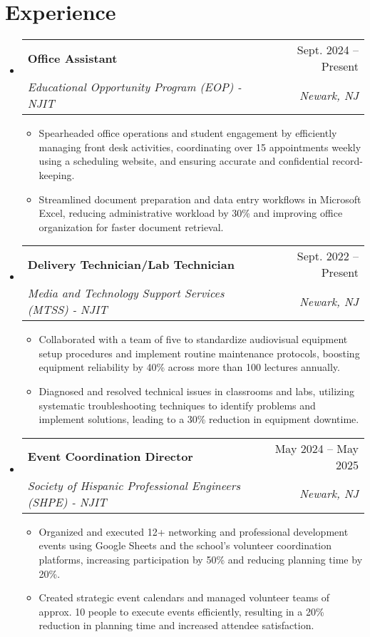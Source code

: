 \documentclass[letterpaper,11pt]{article}
\makeatletter
\newcommand{\resumeItem}[1]{\item\small{{#1 \vspace{-2pt}}}}
\newcommand{\resumeSubheading}[4]{
  \vspace{-2pt}\item
    \begin{tabular*}{0.97\textwidth}[t]{l@{\extracolsep{\fill}}r}
      \textbf{#1} & #2 \\
      \textit{\small#3} & \textit{\small #4} \\
    \end{tabular*}\vspace{-7pt}
}
\newcommand{\resumeSubHeadingListStart}{\begin{itemize}[leftmargin=0.15in, label={}]}
\newcommand{\resumeSubHeadingListEnd}{\end{itemize}}
\newcommand{\resumeItemListStart}{\begin{itemize}}
\newcommand{\resumeItemListEnd}{\end{itemize}\vspace{-5pt}}
\makeatother
\begin{document}
\section{Experience}
  \resumeSubHeadingListStart
    \resumeSubheading
      {Office Assistant}{Sept. 2024 -- Present}
      {Educational Opportunity Program (EOP) - NJIT}{Newark, NJ}
      \resumeItemListStart
        \resumeItem{Spearheaded office operations and student engagement by efficiently managing front desk activities, coordinating over 15 appointments weekly using a scheduling website, and ensuring accurate and confidential record-keeping.}
        \resumeItem{Streamlined document preparation and data entry workflows in Microsoft Excel, reducing administrative workload by 30\% and improving office organization for faster document retrieval.}
      \resumeItemListEnd

    \resumeSubheading
      {Delivery Technician/Lab Technician}{Sept. 2022 -- Present}
      {Media and Technology Support Services (MTSS) - NJIT}{Newark, NJ}
      \resumeItemListStart
        \resumeItem{Collaborated with a team of five to standardize audiovisual equipment setup procedures and implement routine maintenance protocols, boosting equipment reliability by 40\% across more than 100 lectures annually.}
        \resumeItem{Diagnosed and resolved technical issues in classrooms and labs, utilizing systematic troubleshooting techniques to identify problems and implement solutions, leading to a 30\% reduction in equipment downtime.}
      \resumeItemListEnd
      
    \resumeSubheading
      {Event Coordination Director}{May 2024 -- May 2025}
      {Society of Hispanic Professional Engineers (SHPE) - NJIT}{Newark, NJ}
      \resumeItemListStart
        \resumeItem{Organized and executed 12+ networking and professional development events using Google Sheets and the school's volunteer coordination platforms, increasing participation by 50\% and reducing planning time by 20\%.}
        \resumeItem{Created strategic event calendars and managed volunteer teams of approx. 10 people to execute events efficiently, resulting in a 20\% reduction in planning time and increased attendee satisfaction.}
      \resumeItemListEnd
      
  \resumeSubHeadingListEnd

\end{document}
